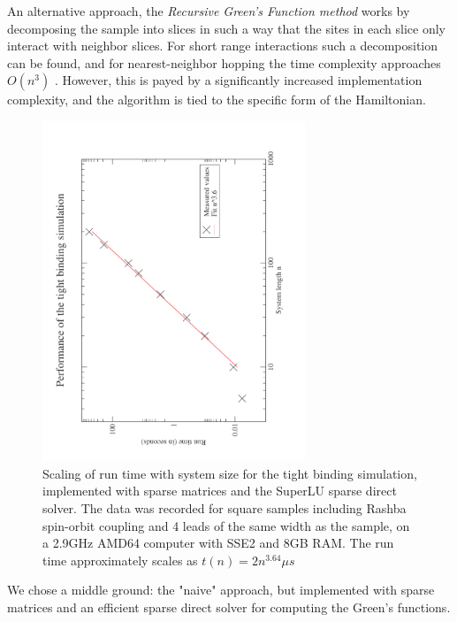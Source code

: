 An alternative approach, the \emph{Recursive Green's Function method} works by
decomposing the sample into slices in such a way that the sites in each slice
only interact with neighbor slices. For short range interactions such a
decomposition can be found, and for nearest-neighbor hopping the time
complexity approaches $O(n^3)$ \cite{rgfschmelcher}. However, this is payed by
a significantly increased implementation complexity, and the algorithm is tied
to the specific form of the Hamiltonian.

\begin{figure}[htb]
    \begin{center}
    \includegraphics[angle=270,width=0.7\textwidth]{scaling.pdf}
    \end{center}
    \caption{Scaling of run time with system size for the tight binding
        simulation, implemented with sparse matrices and the SuperLU sparse
        direct solver. The data was recorded for square samples including
        Rashba spin-orbit coupling and 4 leads of the same width as the
        sample, on a 2.9GHz AMD64 computer with SSE2 and 8GB RAM.
        The run time approximately scales as $t(n) = 2
        n^{3.64}\mu s$}
        \label{fig:scaling}
\end{figure}

We chose a middle ground: the "naive" approach, but implemented with sparse
matrices and an efficient sparse direct solver \cite{superlu99} for
computing the Green's functions.

